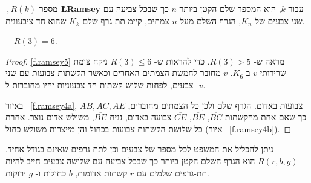 \begin{definition}
$\, ,R(k)$
\textbf{מספר
\L{Ramsey}}
עבור 
$k$,
הוא המספר שלם הקטן ביותר 
$n$
כך 
\textbf{שבכל}
צביעה עם שני צבעים של
$K_{n}$,
הגרף השלם מעל 
$n$
צמתים, קיימ תת-גרף שלם 
$K_k$
שהוא חד-ציבעונית.
\end{definition}
\begin{theorem}[\L{Ramsey}]
$\quad R(3)=6$.\label{thm.ramsey}
\end{theorem}

\begin{proof}
\ref{f.ramsey5}
מראה ש-%
$R(3)>5$.
כדי להראות ש-%
$R(3)\leq 6$
ניקח צומת שרירותי 
$v$
ב%
$K_6$.
$v$
מחובר לחמשת הצמתים האחרים וכאשר הקשתות צבועות עם שני צבעים, לפחות שלוש קשתות חד-צבעוניות יהיו מחוברות ל-%
$v$. 

באיור%
~\ref{f.ramsey4a}, $\overline{AB}, \overline{AC}, \overline{AE}$ 
צבועות באדום. הגרף שלם ולכן כל הצמתים מחוברים, כך שאם אחת מהקשתות 
$\overline{BC}$, $\overline{BE}$, $\overline{CE}$
צבועה באדום, נניח
$\overline{BE}$,
משולש אדום נוצר. אחרת כל שלושת הקשתות צבועות בכחול והן מייצרות משולש כחול 
(איור%
~\ref{f.ramsey4b}).
\end{proof}

ניתן להכליל את המשפט לכל מספר של צבעים וכן לתת-גרפים שאינם בגודל אחיד. 
$R(r,b,g)$
הוא הגרף השלם הקטן ביותר כך שבכל צביעה עם שלושה צבעים חייב להיות תת-גרפים שלמים עם 
$r$
קשתות אדומות, 
$b$
כחולות ו-%
$g$
ירוקות.

